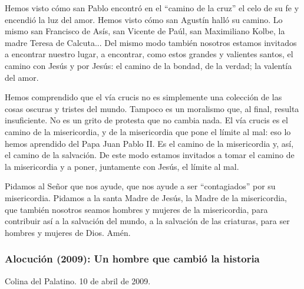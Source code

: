 			\begin{body}Hemos visto cómo san Pablo encontró en el “camino de la cruz” el celo de su fe y encendió la luz del amor. Hemos visto cómo san Agustín halló su camino. Lo mismo san Francisco de Asís, san Vicente de Paúl, san Maximiliano Kolbe, la madre Teresa de Calcuta... Del mismo modo también nosotros estamos invitados a encontrar nuestro lugar, a encontrar, como estos grandes y valientes santos, el camino con Jesús y por Jesús: el camino de la bondad, de la verdad; la valentía del amor.\end{body}
			
			\begin{body} Hemos comprendido que el vía crucis no es simplemente una colección de las cosas oscuras y tristes del mundo. Tampoco es un moralismo que, al final, resulta insuficiente. No es un grito de protesta que no cambia nada. El vía crucis es el camino de la misericordia, y de la misericordia que pone el límite al mal: eso lo hemos aprendido del Papa Juan Pablo II. Es el camino de la misericordia y, así, el camino de la salvación. De este modo estamos invitados a tomar el camino de la misericordia y a poner, juntamente con Jesús, el límite al mal. \end{body}
			
			\begin{body}Pidamos al Señor que nos ayude, que nos ayude a ser “contagiados” por su misericordia. Pidamos a la santa Madre de Jesús, la Madre de la misericordia, que también nosotros seamos hombres y mujeres de la misericordia, para contribuir así a la salvación del mundo, a la salvación de las criaturas, para ser hombres y mujeres de Dios. Amén.\end{body}
			
			\subsubsection{Alocución (2009): Un hombre que cambió la historia}
			
			\begin{referencia}Colina del Palatino. 10 de abril de 2009. \end{referencia}
			
